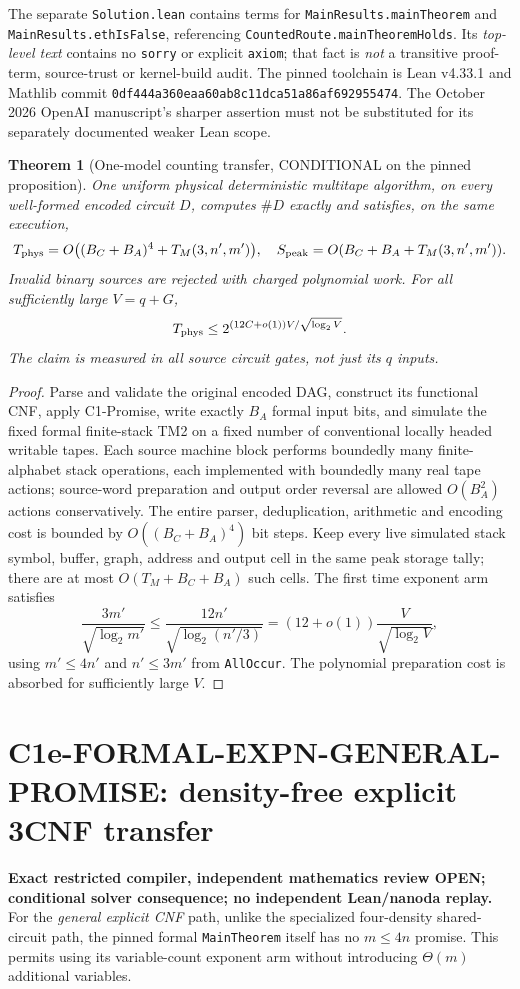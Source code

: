 \documentclass[11pt]{article}
\newtheorem{theorem}{Theorem}
\begin{document}
The separate \texttt{Solution.lean} contains terms for \texttt{MainResults.mainTheorem} and
\texttt{MainResults.ethIsFalse}, referencing
\texttt{CountedRoute.mainTheoremHolds}. Its \emph{top-level text} contains no
\texttt{sorry} or explicit \texttt{axiom}; that fact is \emph{not} a transitive proof-term, source-trust or kernel-build audit. The pinned toolchain is Lean v4.33.1 and Mathlib commit
\texttt{0df444a360eaa60ab8c11dca51a86af692955474}. The October 2026 OpenAI manuscript's sharper assertion must not be substituted for its separately documented weaker Lean scope.

\begin{theorem}[One-model counting transfer, CONDITIONAL on the pinned proposition]
One uniform physical deterministic multitape algorithm, on every well-formed encoded circuit $D$, computes $\#D$ exactly and satisfies, on the \emph{same execution},
\[
 T_{\rm phys}=O\bigl((B_C+B_A)^4+T_M(3,n',m')\bigr),
 \quad
 S_{\rm peak}=O(B_C+B_A+T_M(3,n',m')).
\]
Invalid binary sources are rejected with charged polynomial work. For all sufficiently large $V=q+G$,
\[
T_{\rm phys}\le2^{(12C+o(1))V/\sqrt{\log_2V}}.
\]
The claim is measured in \emph{all} source circuit gates, not just its $q$ inputs.
\end{theorem}
\begin{proof}
Parse and validate the original encoded DAG, construct its functional CNF,
apply C1-Promise, write exactly $B_A$ formal input bits, and simulate the
fixed formal finite-stack TM2 on a fixed number of conventional locally
headed writable tapes. Each source machine block performs boundedly many
finite-alphabet stack operations, each implemented with boundedly many real
tape actions; source-word preparation and output order reversal are allowed
$O(B_A^2)$ actions conservatively. The entire parser, deduplication, arithmetic
and encoding cost is bounded by $O((B_C+B_A)^4)$ bit steps.
Keep every live simulated stack symbol, buffer, graph, address and output cell
in the same peak storage tally; there are at most $O(T_M+B_C+B_A)$ such cells.
The first time exponent arm satisfies
\[
\frac{3m'}{\sqrt{\log_2m'}}
\le\frac{12n'}{\sqrt{\log_2(n'/3)}}
=(12+o(1))\frac{V}{\sqrt{\log_2V}},
\]
using $m'\le4n'$ and $n'\le3m'$ from \texttt{AllOccur}.
The polynomial preparation cost is absorbed for sufficiently large $V$.
\end{proof}



\section{C1e-FORMAL-EXPN-GENERAL-PROMISE: density-free explicit 3CNF transfer}
\textbf{Exact restricted compiler, independent mathematics review OPEN;
conditional solver consequence; no independent Lean/nanoda replay.}
For the \emph{general explicit CNF} path, unlike the specialized
four-density shared-circuit path, the pinned formal
\texttt{MainTheorem} itself has no $m\le4n$ promise.
This permits using its variable-count exponent arm without
introducing $\Theta(m)$ additional variables.
\end{document}
